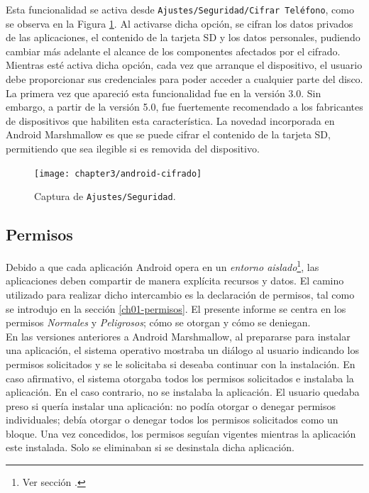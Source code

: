 Esta funcionalidad se activa desde \texttt{Ajustes/Seguridad/Cifrar Teléfono}, como se observa en la Figura \ref{fig:ch03:android-cifrado}. Al activarse dicha opción, se cifran los datos privados de las aplicaciones, el contenido de la tarjeta SD y los datos personales, pudiendo cambiar más adelante el alcance de los componentes afectados por el cifrado. Mientras esté activa dicha opción, cada vez que arranque el dispositivo, el usuario debe proporcionar sus credenciales para poder acceder a cualquier parte del disco.\\
La primera vez que apareció esta funcionalidad fue en la versión 3.0. Sin embargo, a partir de la versión 5.0, fue fuertemente recomendado a los fabricantes de dispositivos que habiliten esta característica. La novedad incorporada en Android Marshmallow es que se puede cifrar el contenido de la tarjeta SD, permitiendo que sea ilegible si es removida del dispositivo.
\begin{figure}[htbp]
	\begin{center}
		\texttt{[image: chapter3/android-cifrado]}
		\caption{Captura de \texttt{Ajustes/Seguridad}.}
		\label{fig:ch03:android-cifrado}
	\end{center}
\end{figure}
\subsection{Permisos}\label{ch03-permisos}
Debido a que cada aplicación Android opera en un \emph{entorno aislado}\footnote{Ver sección .}, las aplicaciones deben compartir de manera explícita recursos y datos. El camino utilizado para realizar dicho intercambio es la declaración de permisos, tal como se introdujo en la sección \ref{ch01-permisos}. El presente informe se centra en los permisos \emph{Normales} y \emph{Peligrosos}; cómo se otorgan y cómo se deniegan.\\

En las versiones anteriores a Android Marshmallow, al prepararse para instalar una aplicación, el sistema operativo mostraba un diálogo al usuario indicando los permisos solicitados y se le solicitaba si deseaba continuar con la instalación. En caso afirmativo, el sistema otorgaba todos los permisos solicitados e instalaba la aplicación. En el caso contrario, no se instalaba la aplicación. El usuario quedaba preso si quería instalar una aplicación: no podía otorgar o denegar permisos individuales; debía otorgar o denegar todos los permisos solicitados como un bloque. Una vez concedidos, los permisos seguían vigentes mientras la aplicación este instalada. Solo se eliminaban si se desinstala dicha aplicación.\\

